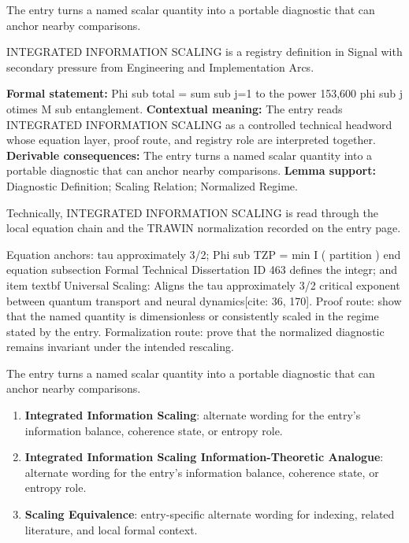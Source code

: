 The entry turns a named scalar quantity into a portable diagnostic that can anchor nearby comparisons.
\clearpage


\begingroup\small
{}
INTEGRATED INFORMATION SCALING is a registry definition in Signal with secondary pressure from Engineering and Implementation Arcs.

\begingroup\footnotesize\setlength{\emergencystretch}{3em}\sloppy
\textbf{Formal statement:} Phi sub total = sum sub j=1 to the power 153,600 phi sub j otimes M sub entanglement. \textbf{Contextual meaning:} The entry reads INTEGRATED INFORMATION SCALING as a controlled technical headword whose equation layer, proof route, and registry role are interpreted together. \textbf{Derivable consequences:} The entry turns a named scalar quantity into a portable diagnostic that can anchor nearby comparisons. \textbf{Lemma support:} Diagnostic Definition; Scaling Relation; Normalized Regime.\par
\endgroup

Technically, INTEGRATED INFORMATION SCALING is read through the local equation chain and the TRAWIN normalization recorded on the entry page.

Equation anchors: tau approximately 3/2; Phi sub TZP = min I ( partition ) end equation subsection Formal Technical Dissertation ID 463 defines the integr; and item textbf Universal Scaling: Aligns the tau approximately 3/2 critical exponent between quantum transport and neural dynamics[cite: 36, 170]. Proof route: show that the named quantity is dimensionless or consistently scaled in the regime stated by the entry. Formalization route: prove that the normalized diagnostic remains invariant under the intended rescaling.

The entry turns a named scalar quantity into a portable diagnostic that can anchor nearby comparisons.
\endgroup

\begin{enumerate}[leftmargin=1.6em,itemsep=6pt,topsep=4pt]
\item \textbf{Integrated Information Scaling}: alternate wording for the entry's information balance, coherence state, or entropy role.
\item \textbf{Integrated Information Scaling Information-Theoretic Analogue}: alternate wording for the entry's information balance, coherence state, or entropy role.
\item \textbf{Scaling Equivalence}: entry-specific alternate wording for indexing, related literature, and local formal context.
\end{enumerate}

